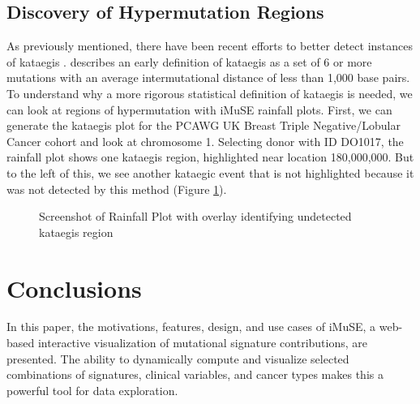 \documentclass[12pt, letterpaper]{article}
\begin{document}
\subsection{Discovery of Hypermutation Regions}
As previously mentioned, there have been recent efforts to better detect instances of kataegis \citep{yousif2018origins}.
\citet{alexandrov2013signatures} describes an early definition of kataegis as a set of 6 or more mutations with an average intermutational distance of less than 1,000 base pairs.
To understand why a more rigorous statistical definition of kataegis is needed, we can look at regions of hypermutation with iMuSE rainfall plots.
First, we can generate the kataegis plot for the PCAWG UK Breast Triple Negative/Lobular Cancer cohort and look at chromosome 1.
Selecting donor with ID DO1017, the rainfall plot shows one kataegis region, highlighted near location 180,000,000. 
But to the left of this, we see another kataegic event that is not highlighted because it was not detected by this method (Figure \ref{fig:caseStudy3}).
\begin{figure}[h]
    \centering
    \caption{Screenshot of Rainfall Plot with overlay identifying undetected kataegis region}
    \label{fig:caseStudy3}
\end{figure}


\section{Conclusions}
In this paper, the motivations, features, design, and use cases of iMuSE, a web-based interactive visualization of mutational signature contributions, are presented. 
The ability to dynamically compute and visualize selected combinations of signatures, clinical variables, and cancer types makes this a powerful tool for data exploration.
\end{document}
